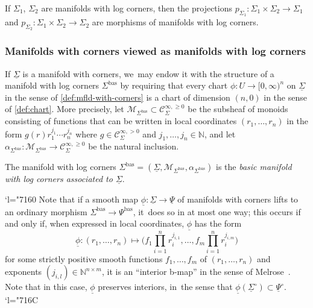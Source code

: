 \documentclass[10pt]{amsart}
\newcommand{\Changel}{\mathcode`l="7160}
\newcommand{\Changelback}{\mathcode`l="716C}
\newcommand{\rbbrac}[1]{\biggl(#1\biggr)}
\theoremstyle{definition}
\theoremstyle{remark}
\newenvironment{example}
  {\pushQED{\qed}\renewcommand{\qedsymbol}{$\lozenge$}\examplex}
  {\popQED\endexamplex}
\let\defn\emph
\newcommand{\NN}{\mathbb{N}}
\renewcommand{\ge}{\geqslant}
\newcommand{\cM}{\mathscr{M}}
\newcommand{\Cinfpos}[1]{\mathscr{C}^{\infty, > 0}_{#1}}
\newcommand{\Cinfge}[1]{\mathscr{C}^{\infty, \ge 0}_{#1}}
\newcommand{\Sig}{\Sigma}
\newcommand{\uSig}{\underline{\Sigma}}
\newcommand{\uphi}{\underline{\phi}}
\newcommand{\uPsi}{\underline{\Psi}}
\newcommand{\bas}[1]{{#1}^{\mathrm{bas}}}
\newcommand{\Sigbas}{\bas{\Sig}}
\newcommand{\Psibas}{\bas{\Psi}}
\begin{document}
\begin{example}
If $\Sig_1$, $\Sig_2$ are manifolds with log corners, then the projections $p_{\Sig_1}\colon\Sig_1\times \Sig_2\to \Sig_1$ and $p_{\Sig_2}\colon\Sig_1\times\Sig_2\to \Sig_2$ are morphisms of manifolds with log corners.
\end{example}

\subsubsection{Manifolds with corners viewed as manifolds with log corners}

If $\uSig$ is a manifold with corners, we~may endow it with the structure of a manifold with log corners $\Sigbas$ by requiring that every chart $\phi\colon U\to [0,\infty)^n$ on $\uSig$ in the sense of \autoref{def:mfld-with-corners} is a chart of dimension $(n,0)$ in the sense of \autoref{def:chart}. More precisely, let $\cM_{\Sigbas} \subset \Cinfge{\Sig}$ be the subsheaf of monoids consisting of functions that can be written in local coordinates $(r_1,\ldots,r_n)$ in the form $g(r) r_1^{j_1}\cdots r_n^{j_n}$ where $g \!\in\! \Cinfpos{\Sig}$ and \hbox{$j_1,\ldots,j_n\!\in\!\NN$}, and let $\alpha_{\Sigbas} : \cM_{\Sigbas} \to \Cinfge{\Sig}$ be the natural inclusion.

\begin{definition}\label{def:Sigbas}
The manifold with log corners $\Sigbas = (\uSig,\cM_{\Sigbas},\alpha_{\Sigbas})$ is the \defn{basic
manifold with log corners associated to $\uSig$}.
\end{definition}

\Changel
Note that if a smooth map $\uphi:\uSig \to \uPsi$ of manifolds with corners lifts to an ordinary morphism $\Sigbas \to \Psibas$, it~does so in at most one way; this occurs if and only if, when expressed in local coordinates, $\uphi$ has the form
\[
\uphi \colon (r_1,\ldots,r_n) \longmapsto \rbbrac{f_1 \prod_{i=1}^n r_i^{j_{i,1}},\ldots, f_{m} \prod_{i=1}^n r_i^{j_{i,m}}}
\]
for some strictly positive smooth functions $f_1,\ldots,f_{m}$ of $(r_1,\ldots,r_n)$ and exponents $(j_{i,l}) \in \NN^{n\times m}$, \ie it is an ``interior b-map'' in the sense of Melrose~\cite{Melrose1992}. Note that in this case, $\uphi$ preserves interiors, in~the sense that $\uphi(\uSig^\circ) \subset \uPsi^\circ$.
\Changelback
\end{document}
